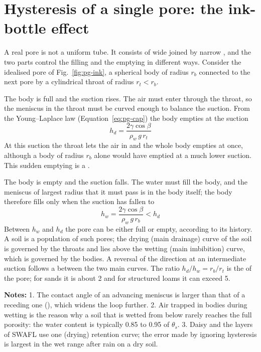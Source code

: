\label{ch:pg-deep}
\section{Hysteresis of a single pore: the ink-bottle effect}\label{sec:pg-ink}
A real pore is not a uniform tube. It consists of wide  joined by narrow , and the two parts control the filling and the emptying in different ways. Consider the idealised pore of Fig.~\ref{fig:pg-ink}, a spherical body of radius $r_b$ connected to the next pore by a cylindrical throat of radius $r_t<r_b$.

 The body is full and the suction rises. The air must enter through the throat, so the meniscus in the throat must be curved enough to balance the suction. From the Young--Laplace law (Equation~\ref{eq:pg-cap}) the body empties at the suction
\begin{equation}\label{eq:pg-hd}\boxed{h_d=\frac{2\gamma\cos\beta}{\rho_w\,g\,r_t}}\end{equation}
At this suction the throat lets the air in and the whole body empties at once, although a body of radius $r_b$ alone would have emptied at a much lower suction. This sudden emptying is a .

 The body is empty and the suction falls. The water must fill the body, and the meniscus of largest radius that it must pass is in the body itself; the body therefore fills only when the suction has fallen to
\begin{equation}\label{eq:pg-hw}\boxed{h_w=\frac{2\gamma\cos\beta}{\rho_w\,g\,r_b}<h_d}\end{equation}
Between $h_w$ and $h_d$ the pore can be either full or empty, according to its history. A soil is a population of such pores; the drying (main drainage) curve of the soil is governed by the throats and lies above the wetting (main imbibition) curve, which is governed by the bodies. A reversal of the direction at an intermediate suction follows a  between the two main curves. The ratio $h_d/h_w=r_b/r_t$ is the  of the pore; for sands it is about 2 and for structured loams it can exceed 5.

\par\noindent\textbf{Notes:} 1. The contact angle of an advancing meniscus is larger than that of a receding one (), which widens the loop further. 2. Air trapped in bodies during wetting is the reason why a soil that is wetted from below rarely reaches the full porosity: the  water content is typically 0.85 to 0.95 of $\theta_s$. 3. Daisy and the layers of SWAFL use one (drying) retention curve; the error made by ignoring hysteresis is largest in the wet range after rain on a dry soil.


